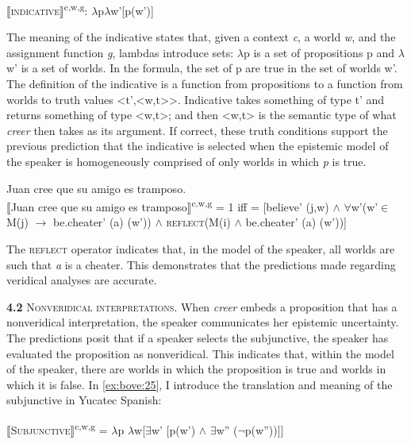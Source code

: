 \documentclass[output=paper,colorlinks,citecolor=brown,
]{langscibook}
\begin{document}
\begin{exe}
    \ex\label{ex:bove:23}
    ⟦\textsc{indicative}⟧\textsuperscript{c,w,g}: $\lambda$p$\lambda $w'[p(w')]
\end{exe}


The meaning of the indicative states that, given a context \textit{c}, a world \textit{w}, and the assignment function \textit{g}, lambdas introduce sets: $\lambda$p is a set of propositions p and $\lambda$w' is a set of worlds. In the formula, the set of p are true in the set of worlds w'. The definition of the indicative is a function from propositions to a function from worlds to truth values {\textless}t',{\textless}w,t{\textgreater}{\textgreater}. Indicative takes something of type t' and returns something of type {\textless}w,t{\textgreater}; and then {\textless}w,t{\textgreater}  is the semantic type of what \textit{creer} then takes as its argument. If correct, these truth conditions support the previous prediction that the indicative is selected when the epistemic model of the speaker is homogeneously comprised of only worlds in which \textit{p} is true. 


\begin{exe}
    \ex\label{ex:bove:24}
        Juan cree que su amigo es tramposo.\\
    ⟦Juan cree que su amigo es tramposo⟧\textsuperscript{c,w,g} = 1 iff = [believe' (j,w) ${\wedge}$ ${\forall}$w'(w'${\in}$ M(j) $\rightarrow$
be.cheater' (a) (w')) ${\wedge}$ \textsc{reflect}(M(i) ${\wedge}$ be.cheater' (a) (w'))]
\end{exe}



The \textsc{reflect} operator indicates that, in the model of the speaker, all worlds are such that \textit{a} is a cheater. This demonstrates that the predictions made regarding veridical analyses are accurate. 


\textbf{4.2 }\textsc{Nonveridical interpretations.} When \textit{creer} embeds a proposition that has a nonveridical interpretation, the speaker communicates her epistemic uncertainty. The predictions posit that if a speaker selects the subjunctive, the speaker has evaluated the proposition as nonveridical. This indicates that, within the model of the speaker, there are worlds in which the proposition is true and worlds in which it is false. In \ref{ex:bove:25}, I introduce the translation and meaning of the subjunctive in Yucatec Spanish:


\begin{exe}
    \ex\label{ex:bove:25}
  
    ⟦\textsc{Subjunctive}⟧\textsuperscript{c,w,g} = $\lambda$p
    $\lambda$w[${\exists}$w' [p(w') ${\wedge}$ ${\exists}$w'' ($\neg$p(w''))]]
\end{exe}
\end{document}
